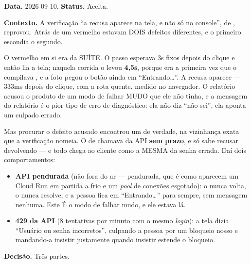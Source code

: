 \textbf{Data.} 2026-09-10. \textbf{Status.} Aceita.

\textbf{Contexto.} A verificação \enquote{a recusa aparece na tela, e não só no
console}, de , reprovou. Atrás de
um vermelho estavam DOIS defeitos diferentes, e o primeiro escondia o segundo.

O vermelho em si era da SUÍTE. O passo esperava 3s fixos depois do clique e então
lia a tela; naquela corrida o  levou
\textbf{4,5s}, porque era a primeira vez que o  compilava
, e a foto pegou o botão ainda em
\enquote{Entrando\ldots}. A recusa aparece --- 333ms depois do clique, com a rota
quente, medido no navegador. O relatório acusou o produto de um modo de falhar
MUDO que ele não tinha, e a mensagem do relatório é o pior tipo de erro de
diagnóstico: ela não diz \enquote{não sei}, ela aponta um culpado errado.

Mas procurar o defeito acusado encontrou um de verdade, na vizinhança exata que
a verificação nomeia. O  de  chamava
 da API \textbf{sem prazo}, e só sabe recusar devolvendo
 --- e todo  chega ao cliente como a MESMA
 da senha errada. Daí dois comportamentos:

\begin{itemize}
  \item \textbf{API pendurada} (não fora do ar --- pendurada, que é como
    aparecem um Cloud Run em partida a frio e um \emph{pool} de conexões
    esgotado): o  nunca volta, o  nunca resolve, e a pessoa
    fica em \enquote{Entrando\ldots} para sempre, sem mensagem nenhuma. Este É o
    modo de falhar mudo, e ele estava lá.
  \item \textbf{429 da API} (8 tentativas por minuto com o mesmo \emph{login}):
    a tela dizia \enquote{Usuário ou senha incorretos}, culpando a pessoa por um
    bloqueio nosso e mandando-a insistir justamente quando insistir estende o
    bloqueio.
\end{itemize}

\textbf{Decisão.} Três partes.

